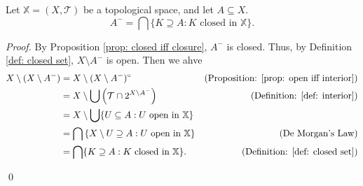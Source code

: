 \begin{proposition}
	\label{prop: closure are the intersection of closure supsersets}	
	Let $\mathbb X = (X, \mathcal T)$ be a topological space, and let $A \subseteq X$.
	$$
	A^- = \bigcap \{K \supseteq A : K \text{ closed in $\mathbb X$}\}.
	$$
	
	\begin{proof}
		By Proposition \ref{prop: closed iff closure}, $A^-$ is closed. Thus, by Definition \ref{def: closed set}, $X \setminus A^{-}$ is open. Then we ahve
		$$
		\begin{aligned}
			X \setminus (X \setminus A^-) &= X \setminus (X \setminus A^-)^\circ
				&\text{(Proposition: \ref{prop: open iff interior})}\\
			&= X \setminus \bigcup \left(\mathcal T \cap 2^{X \setminus A^-} \right)
				&\text{(Definition: \ref{def: interior})} \\
			&= X \setminus \bigcup \{ U \subseteq A : U \text{ open in $\mathbb X$} \}
				&\text{}\\
			&= \bigcap \left\{ X \setminus U \supseteq A : U \text{ open in $\mathbb X$} \right\}
				&\text{(De Morgan's Law)}\\
			&= \bigcap \{ K \supseteq A : K \text{ closed in $\mathbb X$} \}.
				&\text{(Definition: \ref{def: closed set})}\\
		\end{aligned}
		$$
		
		\qed
	\end{proof}
\end{proposition}


